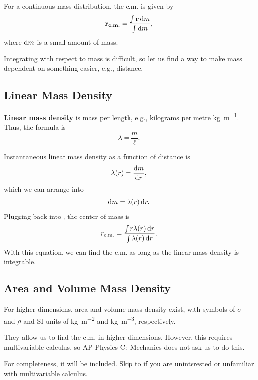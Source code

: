For a continuous mass distribution, the c.m. is given by
\begin{equation} \label{eq:continuous-cm}
    \vec{r_{\mathrm{c.m.}}} = \frac{\int \vec{r} \odif{m}}{\int \odif{m}},
\end{equation}
where \(\odif{m}\) is a small amount of mass.

Integrating with respect to mass is difficult,
so let us find a way to make mass dependent on something easier,
e.g., distance.

\subsection{Linear Mass Density}

\textbf{Linear mass density} is mass per length,
e.g., kilograms per metre \unit{\kilogram \per \metre}.
Thus, the formula is
\begin{equation}
    \lambda = \frac{m}{\ell}.
\end{equation}

Instantaneous linear mass density as a function of distance is
\begin{equation}
    \lambda(r) = \odv{m}{r},
\end{equation}
which we can arrange into
\begin{equation}
    \odif{m} = \lambda(r) \odif{r}.
\end{equation}
Plugging back into , the center of mass is
\begin{equation}
    r_{\mathrm{c.m.}} =
    \frac{\int r \lambda(r) \odif{r}}{\int\lambda(r) \odif{r}}.
\end{equation}
With this equation,
we can find the c.m. as long as the linear mass density is integrable.

\subsection{Area and Volume Mass Density}

For higher dimensions, area and volume mass density exist,
with symbols of \(\sigma\) and \(\rho\)
and SI units of \unit{\kilogram \per \metre\squared}
and \unit{\kilogram \per \metre\cubed}, respectively.

They allow us to find the c.m. in higher dimensions,
However, this requires multivariable calculus,
so AP Physics C:~Mechanics does not ask us to do this.

For completeness, it will be included.
Skip to  if you are uninterested
or unfamiliar with multivariable calculus.

